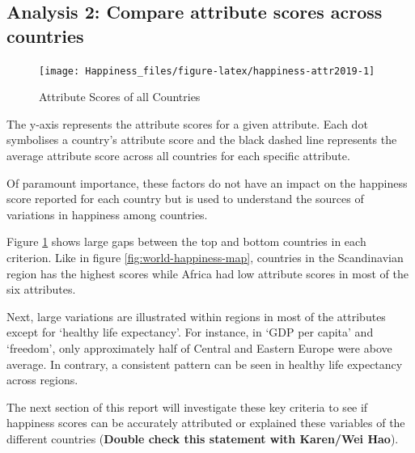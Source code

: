 \documentclass[11pt,a4paper,]{article}
\begin{document}
\clearpage

\hypertarget{analysis-2-compare-attribute-scores-across-countries}{%
\subsection{Analysis 2: Compare attribute scores across countries}\label{analysis-2-compare-attribute-scores-across-countries}}

\begin{figure}

{\centering \texttt{[image: Happiness\_files/figure-latex/happiness-attr2019-1]} 

}

\caption{Attribute Scores of all Countries}\label{fig:happiness-attr2019}
\end{figure}

The y-axis represents the attribute scores for a given attribute. Each dot symbolises a country's attribute score and the black dashed line represents the average attribute score across all countries for each specific attribute.

Of paramount importance, these factors do not have an impact on the happiness score reported for each country but is used to understand the sources of variations in happiness among countries.

Figure \ref{fig:happiness-attr2019} shows large gaps between the top and bottom countries in each criterion. Like in figure \ref{fig:world-happiness-map}, countries in the Scandinavian region has the highest scores while Africa had low attribute scores in most of the six attributes.

Next, large variations are illustrated within regions in most of the attributes except for `healthy life expectancy'. For instance, in `GDP per capita' and `freedom', only approximately half of Central and Eastern Europe were above average. In contrary, a consistent pattern can be seen in healthy life expectancy across regions.

The next section of this report will investigate these key criteria to see if happiness scores can be accurately attributed or explained these variables of the different countries (\textbf{Double check this statement with Karen/Wei Hao}).

\clearpage

\printbibliography
\end{document}

